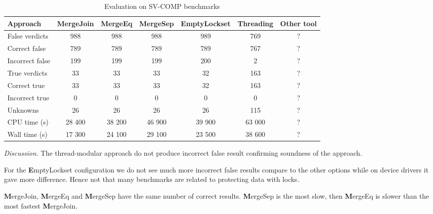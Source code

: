 \begin{center}
  \begin{table}[h]\footnotesize
    \caption{Evaluation on SV-COMP benchmarks}
    \begin{tabular}{ | l | c | c | c | c | c | c |}
      \hline
      Approach         & MergeJoin   & MergeEq & MergeSep & EmptyLockset & Threading & Other tool \\ \hline
      False verdicts & 988    & 988        & 988      & 989       & 769       & ?\\ 
  \hspace{0.5cm} Correct false & 789 & 789 & 789      & 789       & 767       & ?\\ 
  \hspace{0.5cm} Incorrect false & 199 & 199 & 199    & 200       & 2         & ? \\ \hline
      True verdicts  & 33      & 33        & 33       & 32        & 163       & ? \\ 
  \hspace{0.5cm} Correct true & 33 & 33    & 33       & 32        & 163       & ? \\
  \hspace{0.5cm} Incorrect true & 0 & 0    & 0        & 0         & 0         & ? \\ \hline
      Unknowns       & 26     & 26         & 26       & 26        & 115       & ? \\ \hline
      CPU time (s)   & 28 400 & 38 200     & 46 900  & 39 900    & 63 000    & ? \\ 
      Wall time (s)  & 17 300 & 24 100     & 29 100   & 23 500    & 38 600    & ? \\
      \hline
    \end{tabular}
  \end{table}
\end{center}

{\em Discussion.}
The thread-modular approach do not produce incorrect false result confirming soundness of the approach. 

For the {\textbf EmptyLockset} configuration we do not see much more incorrect false results compare to the other options while on device drivers it gave more difference.
Hence not that many benchmarks are related to protecting data with locks.

{\textbf MergeJoin}, {\textbf MergeEq} and {\textbf MergeSep} have the same number of correct results. {\textbf MergeSep} is the most slow, then {\textbf MergeEq} is slower than the most fastest {\textbf MergeJoin}.

